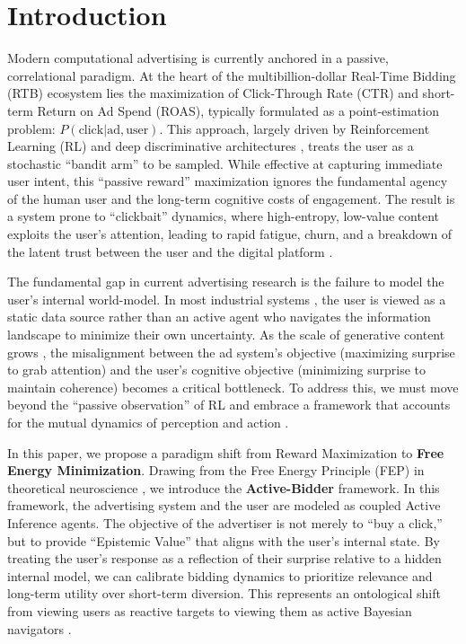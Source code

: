 \section{Introduction}
\label{sec:introduction}

Modern computational advertising is currently anchored in a passive, correlational paradigm. At the heart of the multibillion-dollar Real-Time Bidding (RTB) ecosystem lies the maximization of Click-Through Rate (CTR) and short-term Return on Ad Spend (ROAS), typically formulated as a point-estimation problem: $P(\text{click} | \text{ad}, \text{user})$. This approach, largely driven by Reinforcement Learning (RL) \citep{sutton2018reinforcement} and deep discriminative architectures \citep{he2016deep, devlin2018bert}, treats the user as a stochastic ``bandit arm'' to be sampled. While effective at capturing immediate user intent, this ``passive reward'' maximization ignores the fundamental agency of the human user and the long-term cognitive costs of engagement. The result is a system prone to ``clickbait'' dynamics, where high-entropy, low-value content exploits the user's attention, leading to rapid fatigue, churn, and a breakdown of the latent trust between the user and the digital platform \citep{zhao2023survey, achiam2023gpt}.

The fundamental gap in current advertising research is the failure to model the user's internal world-model. In most industrial systems \citep{touvron2023llama, dubey2024llama}, the user is viewed as a static data source rather than an active agent who navigates the information landscape to minimize their own uncertainty. As the scale of generative content grows \citep{rombach2022high, peebles2023scalable}, the misalignment between the ad system's objective (maximizing surprise to grab attention) and the user's cognitive objective (minimizing surprise to maintain coherence) becomes a critical bottleneck. To address this, we must move beyond the ``passive observation'' of RL and embrace a framework that accounts for the mutual dynamics of perception and action \citep{silver2016mastering, pathak2024foundation}.

In this paper, we propose a paradigm shift from Reward Maximization to \textbf{Free Energy Minimization}. Drawing from the Free Energy Principle (FEP) in theoretical neuroscience \citep{friston2010free}, we introduce the \textbf{Active-Bidder} framework. In this framework, the advertising system and the user are modeled as coupled Active Inference agents. The objective of the advertiser is not merely to ``buy a click,'' but to provide ``Epistemic Value'' that aligns with the user’s internal state. By treating the user's response as a reflection of their surprise relative to a hidden internal model, we can calibrate bidding dynamics to prioritize relevance and long-term utility over short-term diversion. This represents an ontological shift from viewing users as reactive targets to viewing them as active Bayesian navigators \citep{yang2024zero, bronstein2024geometric}.

